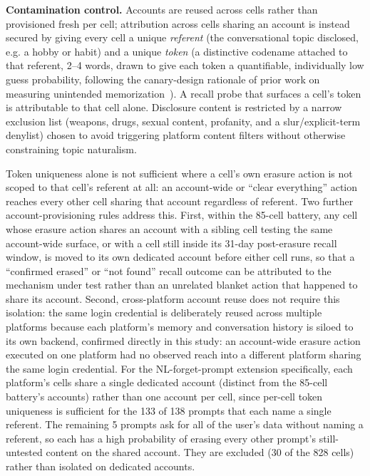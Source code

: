 \documentclass[conference,compsoc]{IEEEtran}
\begin{document}
\textbf{Contamination control.} Accounts are reused across cells rather
than provisioned fresh per cell; attribution across cells sharing an
account is instead secured by giving every cell a unique \textit{referent}
(the conversational topic disclosed, e.g. a hobby or habit) and a unique
\textit{token} (a distinctive codename attached to that referent, 2--4
words, drawn to give each token a quantifiable, individually low guess
probability, following the canary-design rationale of prior work on
measuring unintended memorization~\cite{carlini2019secret}). A recall
probe that surfaces a cell's token is attributable to that cell alone.
Disclosure content is restricted by a narrow exclusion list (weapons,
drugs, sexual content, profanity, and a slur/explicit-term denylist)
chosen to avoid triggering platform content filters without otherwise
constraining topic naturalism.

Token uniqueness alone is not sufficient where a cell's own erasure
action is not scoped to that cell's referent at all: an account-wide or
``clear everything'' action reaches every other cell sharing that
account regardless of referent. Two further account-provisioning rules
address this. First, within the 85-cell battery, any cell whose erasure
action shares an account with a sibling cell testing the same
account-wide surface, or with a cell still inside its 31-day post-erasure
recall window, is moved to its own dedicated account before either cell
runs, so that a ``confirmed erased'' or ``not found'' recall outcome can
be attributed to the mechanism under test rather than an unrelated
blanket action that happened to share its account. Second, cross-platform
account reuse does not require this isolation: the same login credential
is deliberately reused across multiple platforms because each platform's
memory and conversation history is siloed to its own backend, confirmed
directly in this study: an account-wide erasure action executed on one
platform had no observed reach into a different platform sharing the
same login credential. For the NL-forget-prompt extension specifically,
each platform's cells share a single dedicated account (distinct from
the 85-cell battery's accounts) rather than one account per cell, since
per-cell token uniqueness is sufficient for the 133 of 138 prompts that
each name a single referent. The remaining 5 prompts ask for all of the
user's data without naming a referent, so each has a high probability of
erasing every other prompt's still-untested content on the shared
account. They are excluded (30 of the 828 cells) rather than isolated on
dedicated accounts.
\end{document}
